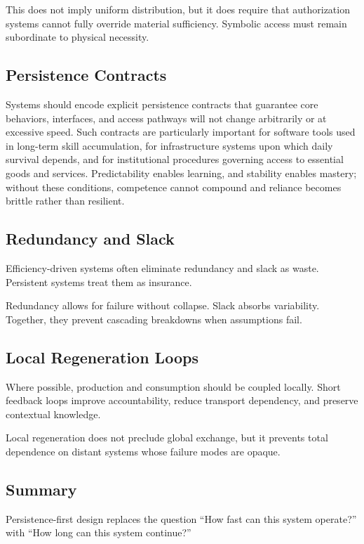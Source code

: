 \documentclass[12pt]{article} \usepackage[margin=1in]{geometry} \usepackage{setspace} \usepackage{amsmath,amssymb} \usepackage{hyperref}
\begin{document}
This does not imply uniform distribution, but it does require that authorization systems cannot fully override material sufficiency. Symbolic access must remain subordinate to physical necessity.

\subsection{Persistence Contracts}

Systems should encode explicit persistence contracts that guarantee core behaviors, interfaces, and access pathways will not change arbitrarily or at excessive speed. Such contracts are particularly important for software tools used in long-term skill accumulation, for infrastructure systems upon which daily survival depends, and for institutional procedures governing access to essential goods and services. Predictability enables learning, and stability enables mastery; without these conditions, competence cannot compound and reliance becomes brittle rather than resilient.

\subsection{Redundancy and Slack}

Efficiency-driven systems often eliminate redundancy and slack as waste. Persistent systems treat them as insurance.

Redundancy allows for failure without collapse. Slack absorbs variability. Together, they prevent cascading breakdowns when assumptions fail.

\subsection{Local Regeneration Loops}

Where possible, production and consumption should be coupled locally. Short feedback loops improve accountability, reduce transport dependency, and preserve contextual knowledge.

Local regeneration does not preclude global exchange, but it prevents total dependence on distant systems whose failure modes are opaque.

\subsection{Summary}

Persistence-first design replaces the question ``How fast can this system operate?'' with ``How long can this system continue?''
\end{document}
